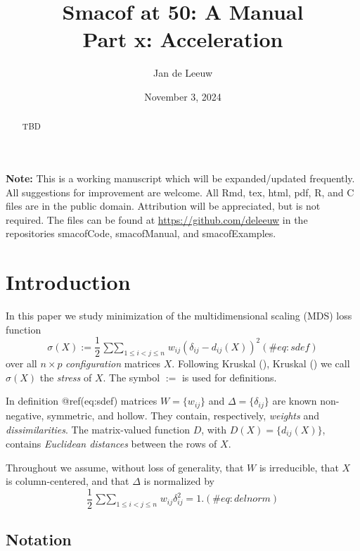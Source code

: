 \documentclass[
  12pt,
  letterpaper,
  DIV=11,
  numbers=noendperiod]{scrartcl}
\title{Smacof at 50: A Manual\\
Part x: Acceleration}
\author{Jan de Leeuw}
\date{November 3, 2024}
\renewcommand*\contentsname{Table of contents}
\newcommand\contentsname{Table of contents}
\begin{document}
\maketitle
\begin{abstract}
TBD
\end{abstract}

\renewcommand*\contentsname{Table of contents}
{
\hypersetup{linkcolor=}
\setcounter{tocdepth}{3}
\tableofcontents
}

\textbf{Note:} This is a working manuscript which will be
expanded/updated frequently. All suggestions for improvement are
welcome. All Rmd, tex, html, pdf, R, and C files are in the public
domain. Attribution will be appreciated, but is not required. The files
can be found at \url{https://github.com/deleeuw} in the repositories
smacofCode, smacofManual, and smacofExamples.

\section{Introduction}\label{introduction}

In this paper we study minimization of the multidimensional scaling
(MDS) loss function \begin{equation}
\sigma(X):=\frac12\mathop{\sum\sum}_{1\leq i<j\leq n} w_{ij}(\delta_{ij}-d_{ij}(X))^2
(\#eq:sdef)
\end{equation} over all \(n\times p\) \emph{configuration} matrices
\(X\). Following Kruskal (), Kruskal
() we call \(\sigma(X)\) the
\emph{stress} of \(X\). The symbol \(:=\) is used for definitions.

In definition @ref(eq:sdef) matrices \(W=\{w_{ij}\}\) and
\(\Delta=\{\delta_{ij}\}\) are known non-negative, symmetric, and
hollow. They contain, respectively, \emph{weights} and
\emph{dissimilarities}. The matrix-valued function \(D\), with
\(D(X)=\{d_{ij}(X)\}\), contains \emph{Euclidean distances} between the
rows of \(X\).

Throughout we assume, without loss of generality, that \(W\) is
irreducible, that \(X\) is column-centered, and that \(\Delta\) is
normalized by \begin{equation}
\frac12\mathop{\sum\sum}_{1\leq i<j\leq n} w_{ij}\delta_{ij}^2=1.
(\#eq:delnorm)
\end{equation}

\subsection{Notation}\label{notation}
\end{document}

